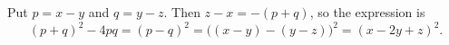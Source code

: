 Put $p=x-y$ and $q=y-z$. Then $z-x=-(p+q)$, so the expression is
\[
(p+q)^2-4pq=(p-q)^2=\bigl((x-y)-(y-z)\bigr)^2=\boxed{(x-2y+z)^2}.
\]
